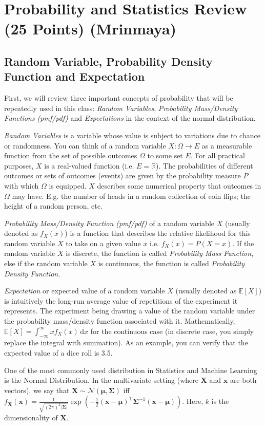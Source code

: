 \section{Probability and Statistics Review (25 Points) (Mrinmaya)}
\subsection{Random Variable, Probability Density Function and Expectation}
First, we will review three important concepts of probability that will be repeatedly used in this class: \textit{Random Variables}, \textit{Probability Mass/Density Functions (pmf/pdf)} and \textit{Expectations} in the context of the normal distribution.

\textit{Random Variables} is a variable whose value is subject to variations due to chance or randomness. You can think of a random variable $X\colon \Omega \to E$ as a measurable function from the set of possible outcomes $\Omega$ to some set $E$. For all practical purposes, $X$ is a real-valued function (i.e. $E=\mathbb{R}$). The probabilities of different outcomes or sets of outcomes (events) are given by the probability measure $P$ with which $\Omega$ is equipped. $X$ describes some numerical property that outcomes in $\Omega$ may have. E.g. the number of heads in a random collection of coin flips; the height of a random person, etc.

\textit{Probability Mass/Density Function (pmf/pdf)} of a random variable $X$ (usually denoted as $f_X(x)$) is a function that describes the relative likelihood for this random variable $X$ to take on a given value $x$ i.e. $f_X(x) = P(X=x)$. If the random variable $X$ is discrete, the function is called \textit{Probability Mass Function}, else if the random variable $X$ is continuous, the function is called \textit{Probability Density Function}.

\textit{Expectation} or expected value of a random variable $X$ (usually denoted as $\mathbb{E}[X]$) is intuitively the long-run average value of repetitions of the experiment it represents. The experiment being drawing a value of the random variable under the probability mass/density function associated with it. Mathematically, $\mathbb{E}[X] = \int_{-\infty}^\infty x f_X(x)\, \mathrm{d}x$ for the continuous case (in discrete case, you simply replace the integral with summation). As an example, you can verify that the expected value of a dice roll is 3.5.

One of the most commonly used distribution in Statistics and Machine Learning is the Normal Distribution. In the multivariate setting (where $\mathbf{X}$ and $\mathbf{x}$ are both vectors), we say that $\mathbf{X} \sim \mathcal{N}(\mathbf{\mu}, \mathbf{\Sigma})$ iff
$f_{\mathbf X}(\mathbf{x}) = \frac{1}{\sqrt{(2\pi)^{k}|\boldsymbol\Sigma|}} \exp\left(-\frac{1}{2}({\mathbf x}-{\boldsymbol\mu})^\mathrm{T}{\boldsymbol\Sigma}^{-1}({\mathbf x}-{\boldsymbol\mu}) \right)$. Here, $k$ is the dimensionality of $\mathbf{X}$.

